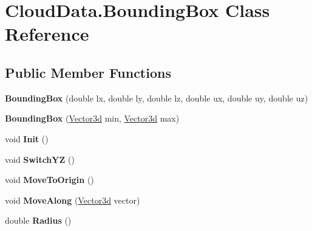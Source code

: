\hypertarget{class_cloud_data_1_1_bounding_box}{}\section{Cloud\+Data.\+Bounding\+Box Class Reference}
\label{class_cloud_data_1_1_bounding_box}
\subsection*{Public Member Functions}
\begin{DoxyCompactItemize}
\item 
\mbox{\label{class_cloud_data_1_1_bounding_box_a86e10f02158869d5ccc808e1826733da}} 
{\bfseries Bounding\+Box} (double lx, double ly, double lz, double ux, double uy, double uz)
\item 
\mbox{\label{class_cloud_data_1_1_bounding_box_a282c814d3b23ca4cd8597ed7e3ac2267}} 
{\bfseries Bounding\+Box} (\hyperlink{class_cloud_data_1_1_vector3d}{Vector3d} min, \hyperlink{class_cloud_data_1_1_vector3d}{Vector3d} max)
\item 
\mbox{\label{class_cloud_data_1_1_bounding_box_a6e915fefab3d9283d229c0e2b1299c74}} 
void {\bfseries Init} ()
\item 
\mbox{\label{class_cloud_data_1_1_bounding_box_afdab2adfb0afb14d7b9f92f552d7d768}} 
void {\bfseries Switch\+YZ} ()
\item 
\mbox{\label{class_cloud_data_1_1_bounding_box_a00101639964ec22073a0f5b40e65d051}} 
void {\bfseries Move\+To\+Origin} ()
\item 
\mbox{\label{class_cloud_data_1_1_bounding_box_a46071c421dcd1259018cd1132a70eeb6}} 
void {\bfseries Move\+Along} (\hyperlink{class_cloud_data_1_1_vector3d}{Vector3d} vector)
\item 
\mbox{\label{class_cloud_data_1_1_bounding_box_a080446f806f02227b9b45da11f8d02d6}} 
double {\bfseries Radius} ()
\item 

\end{DoxyCompactItemize}
